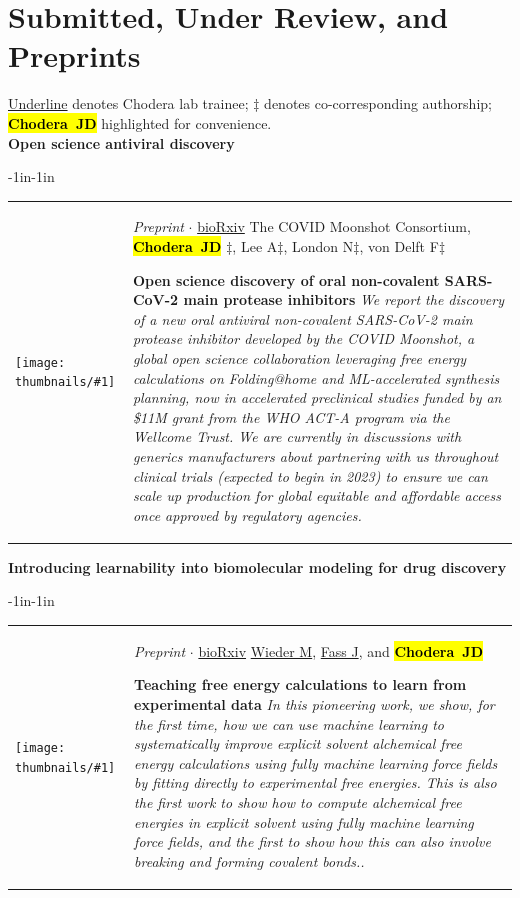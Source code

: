 \documentclass[10pt]{article}
\newcommand{\newarticle}[7]{
\begin{adjustwidth}{-1in}{-1in}  
\begin{tabular}{p{0.9in}p{7in}}
\parbox[c]{0.9in}{\texttt{[image: thumbnails/\#1]}} & \parbox[c]{6in}{\setstretch{0.9} {\small #4} $\cdot$ \href{#6}{#5} \\ {\footnotesize {#2}} \\ \raggedright { \bf\nohyphens{#3}}  \\ {\footnotesize\emph {#7}}} %
\end{tabular}
\end{adjustwidth}
\vspace{0.2in}
}
\newcommand{\jdc}{ {\bf \hl{Chodera~JD}} } %
\begin{document}

\section*{Submitted, Under Review, and Preprints}

{\footnotesize \underline{Underline} denotes Chodera lab trainee; $\ddag$ denotes co-corresponding authorship; \jdc highlighted for convenience.}\\

{\bf Open science antiviral discovery}\\

\newarticle{covid-moonshot-logo-small}{The COVID Moonshot Consortium, \jdc$\ddag$, Lee A$\ddag$, London N$\ddag$, von Delft F$\ddag$}{Open science discovery of oral non-covalent SARS-CoV-2 main protease inhibitors}{\emph{Preprint}}{bioRxiv}{https://doi.org/10.1101/2020.10.29.339317}{We report the discovery of a new oral antiviral non-covalent SARS-CoV-2 main protease inhibitor developed by the COVID Moonshot, a global open science collaboration leveraging free energy calculations on Folding@home and ML-accelerated synthesis planning, now in accelerated preclinical studies funded by an \$11M grant from the WHO ACT-A program via the Wellcome Trust. We are currently in discussions with generics manufacturers about partnering with us throughout clinical trials (expected to begin in 2023) to ensure we can scale up production for global equitable and affordable access once approved by regulatory agencies.}

{\bf Introducing learnability into biomolecular modeling for drug discovery}\\

\newarticle{qml-explicit-free-energy}{\underline{Wieder M}, \underline{Fass J}, and \jdc}{Teaching free energy calculations to learn from experimental data}{\emph{Preprint}}{bioRxiv}{https://doi.org/10.1101/2021.08.24.457513}{In this pioneering work, we show, for the first time, how we can use machine learning to systematically improve explicit solvent alchemical free energy calculations using fully machine learning force fields by fitting directly to experimental free energies. This is also the first work to show how to compute alchemical free energies in explicit solvent using fully machine learning force fields, and the first to show how this can also involve breaking and forming covalent bonds..}
\end{document}
